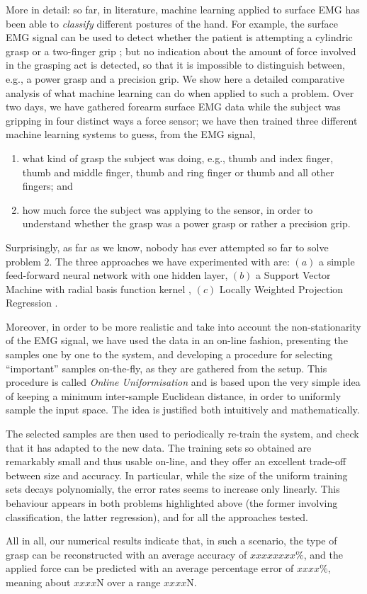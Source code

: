 More in detail: so far, in literature, machine learning applied to
surface EMG has been able to \emph{classify} different postures of the
hand. For example, the surface EMG signal can be used to detect
whether the patient is attempting a cylindric grasp or a two-finger
grip \cite{ekvall}; but no indication about the amount of force
involved in the grasping act is detected, so that it is impossible to
distinguish between, e.g., a power grasp and a precision grip. We show
here a detailed comparative analysis of what machine learning can do
when applied to such a problem. Over two days, we have gathered
forearm surface EMG data while the subject was gripping in four
distinct ways a force sensor; we have then trained three different
machine learning systems to guess, from the EMG signal,

\begin{enumerate}

  \item what kind of grasp the subject was doing, e.g., thumb and
    index finger, thumb and middle finger, thumb and ring finger or
    thumb and all other fingers; and

  \item how much force the subject was applying to the sensor, in
    order to understand whether the grasp was a power grasp or rather
    a precision grip.

\end{enumerate}

Surprisingly, as far as we know, nobody has ever attempted so far to
solve problem $2$. The three approaches we have experimented with are:
$(a)$ a simple feed-forward neural network with one hidden layer,
$(b)$ a Support Vector Machine with radial basis function kernel
\cite{BGV92}, $(c)$ Locally Weighted Projection Regression
\cite{lwpr}.

Moreover, in order to be more realistic and take into account the
non-stationarity of the EMG signal, we have used the data in an
on-line fashion, presenting the samples one by one to the system, and
developing a procedure for selecting ``important'' samples on-the-fly,
as they are gathered from the setup. This procedure is called
\emph{Online Uniformisation} and is based upon the very simple idea of
keeping a minimum inter-sample Euclidean distance, in order to
uniformly sample the input space. The idea is justified both
intuitively and mathematically.

The selected samples are then used to periodically re-train the
system, and check that it has adapted to the new data. The training
sets so obtained are remarkably small and thus usable on-line, and
they offer an excellent trade-off between size and accuracy. In
particular, while the size of the uniform training sets decays
polynomially, the error rates seems to increase only linearly. This
behaviour appears in both problems highlighted above (the former
involving classification, the latter regression), and for all the
approaches tested.

All in all, our numerical results indicate that, in such a scenario,
the type of grasp can be reconstructed with an average accuracy of
$xxxxxxxx\%$, and the applied force can be predicted with an average
percentage error of $xxxx\%$, meaning about $xxxx$N over a range
$xxxx$N.
